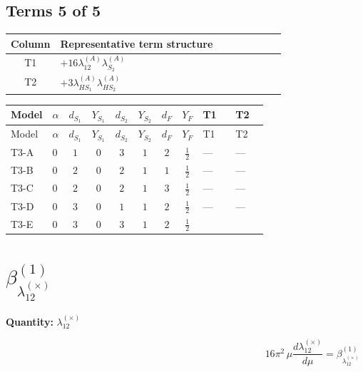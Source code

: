 \documentclass[8pt]{article}
\begin{document}
\begin{landscape}
\subsection*{Terms 5 of 5}
\begin{center}
\begin{tabular}{@{}c >{\raggedright\arraybackslash}p{0.82\linewidth}@{}}
\toprule
Column & Representative term structure \\
\midrule
T1 & \(\displaystyle +16 {\lambda_{12}^{(A)}} {\lambda_{S_2}^{(A)}}\) \\
\midrule
T2 & \(\displaystyle +3 {\lambda_{HS_1}^{(A)}} {\lambda_{HS_2}^{(A)}}\) \\
\midrule
\bottomrule
\end{tabular}
\end{center}
\smallskip
\tiny
\begin{longtable}{@{}llcccccc >{\raggedright\arraybackslash}p{0.21\linewidth} >{\raggedright\arraybackslash}p{0.21\linewidth}@{}}
\toprule
Model & $\alpha$ & $d_{S_1}$ & $Y_{S_1}$ & $d_{S_2}$ & $Y_{S_2}$ & $d_F$ & $Y_F$ & T1 & T2 \\
\midrule
\endfirsthead
\toprule
Model & $\alpha$ & $d_{S_1}$ & $Y_{S_1}$ & $d_{S_2}$ & $Y_{S_2}$ & $d_F$ & $Y_F$ & T1 & T2 \\
\midrule
\endhead
T3-A & $0$ & $1$ & $0$ & $3$ & $1$ & $2$ & $\frac{1}{2}$ & --- & --- \\
\midrule
T3-B & $0$ & $2$ & $0$ & $2$ & $1$ & $1$ & $\frac{1}{2}$ & --- & --- \\
\midrule
T3-C & $0$ & $2$ & $0$ & $2$ & $1$ & $3$ & $\frac{1}{2}$ & --- & --- \\
\midrule
T3-D & $0$ & $3$ & $0$ & $1$ & $1$ & $2$ & $\frac{1}{2}$ & --- & --- \\
\midrule
T3-E & $0$ & $3$ & $0$ & $3$ & $1$ & $2$ & $\frac{1}{2}$ & \scriptsize\adjustbox{max width=\linewidth}{$\begin{gathered} +16 {\lambda_{12}^{(A)}} {\lambda_{S_2}^{(A)}}\end{gathered}$} & \scriptsize\adjustbox{max width=\linewidth}{$\begin{gathered} +3 {\lambda_{HS_1}^{(A)}} {\lambda_{HS_2}^{(A)}}\end{gathered}$} \\
\midrule
\bottomrule
\end{longtable}
\clearpage
\section*{$\beta_{\lambda_{12}^{(\times)}}^{(1)}$}
\noindent\textbf{Quantity: }$\lambda_{12}^{(\times)}$\par\smallskip
\[16\pi^2\,\mu\frac{d \lambda_{12}^{(\times)}}{d\mu}=\beta_{\lambda_{12}^{(\times)}}^{(1)}\]

\end{landscape}
\end{document}

